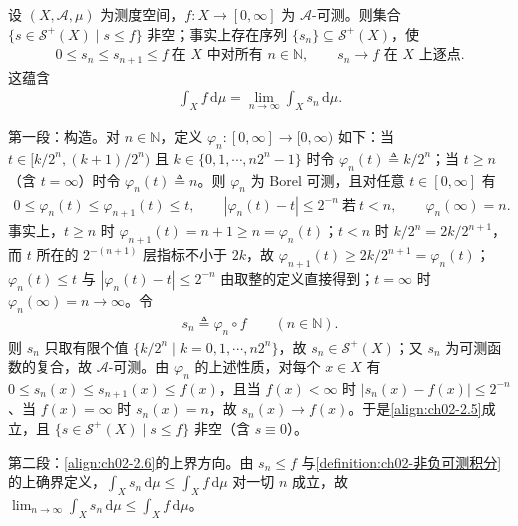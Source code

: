 \documentclass[../../main.tex]{subfiles}%
\begin{document}
\begin{remark}\label{remark:ch02-简单逼近积分}\label{remark:ch02-简单积分}
设 $(X,\mathscr A,\mu)$ 为测度空间，$f:X\to[0,\infty]$ 为 $\mathscr A$-可测。则集合 $\{s\in\mathscr S^+(X)\mid s\leqslant f\}$ 非空；事实上存在序列 $\{s_n\}\subseteq\mathscr S^+(X)$，使
\begin{align}
0\leqslant s_n\leqslant s_{n+1}\leqslant f\ \text{在 }X\text{ 中对所有 }n\in\mathbb N,\qquad s_n\to f\text{ 在 }X\text{ 上逐点}. \label{align:ch02-2.5}
\end{align}
这蕴含
\begin{align}
\int_Xf\,\mathrm{d}\mu=\lim_{n\to\infty}\int_Xs_n\,\mathrm{d}\mu. \label{align:ch02-2.6}
\end{align}

第一段：构造。对 $n\in\mathbb N$，定义 $\varphi_n:[0,\infty]\to[0,\infty)$ 如下：当 $t\in[k/2^n,(k+1)/2^n)$ 且 $k\in\{0,1,\cdots ,n2^n-1\}$ 时令 $\varphi_n(t)\triangleq k/2^n$；当 $t\geqslant n$（含 $t=\infty$）时令 $\varphi_n(t)\triangleq n$。则 $\varphi_n$ 为 Borel 可测，且对任意 $t\in[0,\infty]$ 有
\begin{align*}
0\leqslant\varphi_n(t)\leqslant\varphi_{n+1}(t)\leqslant t,\qquad|\varphi_n(t)-t|\leqslant2^{-n}\ \text{若}\ t<n,\qquad\varphi_n(\infty)=n.
\end{align*}
事实上，$t\geqslant n$ 时 $\varphi_{n+1}(t)=n+1\geqslant n=\varphi_n(t)$；$t<n$ 时 $k/2^n=2k/2^{n+1}$，而 $t$ 所在的 $2^{-(n+1)}$ 层指标不小于 $2k$，故 $\varphi_{n+1}(t)\geqslant2k/2^{n+1}=\varphi_n(t)$；$\varphi_n(t)\leqslant t$ 与 $|\varphi_n(t)-t|\leqslant2^{-n}$ 由取整的定义直接得到；$t=\infty$ 时 $\varphi_n(\infty)=n\to\infty$。令
\begin{align*}
s_n\triangleq\varphi_n\circ f\qquad(n\in\mathbb N).
\end{align*}
则 $s_n$ 只取有限个值 $\{k/2^n\mid k=0,1,\cdots ,n2^n\}$，故 $s_n\in\mathscr S^+(X)$；又 $s_n$ 为可测函数的复合，故 $\mathscr A$-可测。由 $\varphi_n$ 的上述性质，对每个 $x\in X$ 有 $0\leqslant s_n(x)\leqslant s_{n+1}(x)\leqslant f(x)$，且当 $f(x)<\infty$ 时 $|s_n(x)-f(x)|\leqslant2^{-n}$、当 $f(x)=\infty$ 时 $s_n(x)=n$，故 $s_n(x)\to f(x)$。于是\eqref{align:ch02-2.5}成立，且 $\{s\in\mathscr S^+(X)\mid s\leqslant f\}$ 非空（含 $s\equiv0$）。

第二段：\eqref{align:ch02-2.6}的上界方向。由 $s_n\leqslant f$ 与\cref{definition:ch02-非负可测积分}的上确界定义，$\int_Xs_n\,\mathrm{d}\mu\leqslant\int_Xf\,\mathrm{d}\mu$ 对一切 $n$ 成立，故 $\lim_{n\to\infty}\int_Xs_n\,\mathrm{d}\mu\leqslant\int_Xf\,\mathrm{d}\mu$。


\end{remark}
\end{document}
